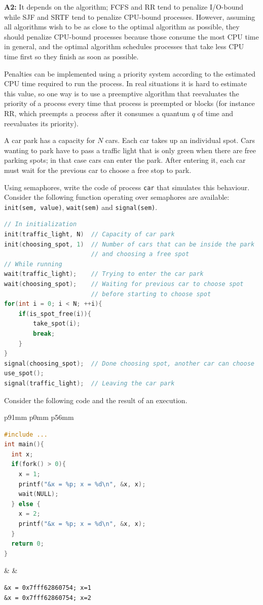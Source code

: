 \documentclass{sope}
\begin{document}
\textbf{A2:} It depends on the algorithm; FCFS and RR tend to penalize I/O-bound while SJF and SRTF tend to penalize CPU-bound processes. However, assuming all algorithms wish to be as close to the optimal algorithm as possible, they should penalize CPU-bound processes because those consume the most CPU time in general, and the optimal algorithm schedules processes that take less CPU time first so they finish as soon as possible.

Penalties can be implemented using a priority system according to the estimated CPU time required to run the process. In real situations it is hard to estimate this value, so one way is to use a preemptive algorithm that reevaluates the priority of a process every time that process is preempted or blocks (for instance RR, which preempts a process after it consumes a quantum $q$ of time and reevaluates its priority).

A car park has a capacity for $N$ cars. Each car takes up an individual spot. Cars wanting to park have to pass a traffic light that is only green when there are free parking spots; in that case cars can enter the park. After entering it, each car must wait for the previous car to choose a free stop to park.

Using semaphores, write the code of process \texttt{car} that simulates this behaviour. Consider the following function operating over semaphores are available: \texttt{init(sem, value)}, \texttt{wait(sem)} and \texttt{signal(sem)}.

\ansseparator

\begin{lstlisting}[language=C]
// In initialization
init(traffic_light, N)  // Capacity of car park
init(choosing_spot, 1)  // Number of cars that can be inside the park
                        // and choosing a free spot
// While running
wait(traffic_light);    // Trying to enter the car park
wait(choosing_spot);    // Waiting for previous car to choose spot
                        // before starting to choose spot
for(int i = 0; i < N; ++i){
    if(is_spot_free(i)){
        take_spot(i);
        break;
    }
}
signal(choosing_spot);  // Done choosing spot, another car can choose
use_spot();
signal(traffic_light);  // Leaving the car park
\end{lstlisting}

Consider the following code and the result of an execution.

\begin{center}
    \begin{tabular}{p{91mm} p{0mm} p{56mm}}
        \begin{lstlisting}[language=C,showstringspaces=false]
#include ...
int main(){
  int x;
  if(fork() > 0){
    x = 1;
    printf("&x = %p; x = %d\n", &x, x);
    wait(NULL);
  } else {
    x = 2;
    printf("&x = %p; x = %d\n", &x, x);
  }
  return 0;
}
        \end{lstlisting} & &
        \begin{lstlisting}
&x = 0x7fff62860754; x=1
&x = 0x7fff62860754; x=2
        \end{lstlisting}
    \end{tabular}
\end{center}
\end{document}
